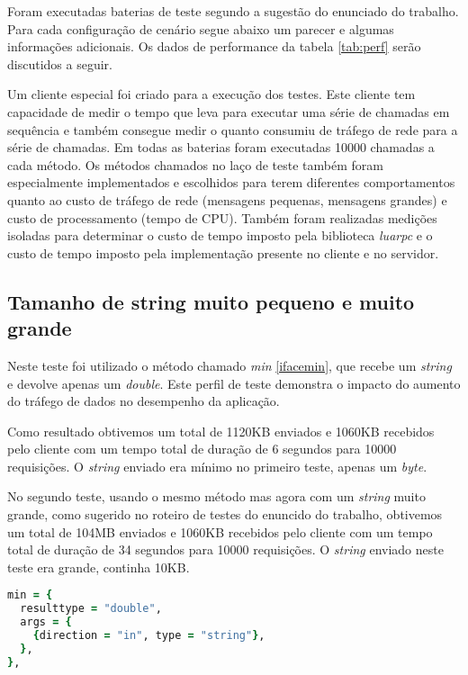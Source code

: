 \documentclass[11pt]{article}
\begin{document}
Foram executadas baterias de teste segundo a sugestão do enunciado do trabalho.
Para cada configuração de cenário segue abaixo um parecer e algumas informações
adicionais. Os dados de performance da tabela \ref{tab:perf} serão discutidos
a seguir.

Um cliente especial foi criado para a execução dos testes. Este cliente tem
capacidade de medir o tempo que leva para executar uma série de chamadas em
sequência e também consegue medir o quanto consumiu de tráfego de rede para a
série de chamadas. Em todas as baterias foram executadas 10000 chamadas a cada
método. Os métodos chamados no laço de teste também foram especialmente
implementados e escolhidos para terem diferentes comportamentos quanto ao custo
de tráfego de rede (mensagens pequenas, mensagens grandes) e custo de
processamento (tempo de CPU). Também foram realizadas medições isoladas para
determinar o custo de tempo imposto pela biblioteca \textit{luarpc} e o custo de
tempo imposto pela implementação presente no cliente e no servidor.

\subsection{Tamanho de string muito pequeno e muito grande}\label{subsec:stringsize}

Neste teste foi utilizado o método chamado \textit{min} \ref{ifacemin}, que
recebe um \textit{string} e devolve apenas um \textit{double}. Este perfil de
teste demonstra o impacto do aumento do tráfego de dados no desempenho da
aplicação.

Como resultado obtivemos um total de 1120KB enviados e 1060KB recebidos pelo
cliente com um tempo total de duração de 6 segundos para 10000 requisições. O
\textit{string} enviado era mínimo no primeiro teste, apenas um \textit{byte}.

No segundo teste, usando o mesmo método mas agora com um \textit{string} muito
grande, como sugerido no roteiro de testes do enuncido do trabalho, obtivemos um
total de 104MB enviados e 1060KB recebidos pelo cliente com um tempo total de
duração de 34 segundos para 10000 requisições. O \textit{string} enviado neste
teste era grande, continha 10KB.

\begin{lstlisting}[label={ifacemin},language=Ruby,caption=Interface min]
min = {
  resulttype = "double",
  args = {
    {direction = "in", type = "string"},
  },
},
\end{lstlisting}
\end{document}
